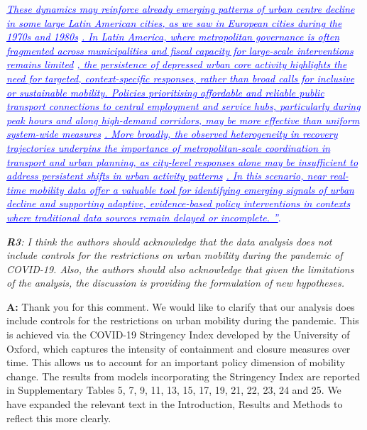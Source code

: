 \documentclass[12pt,a4paper,oneside, reqno]{amsart}
\begin{document}
{\begin{itemize}[noitemsep, topsep=0pt]
\end{itemize} }

\setlength{\leftskip}{1.3cm}\textcolor{blue}{\textit{\ul{These dynamics may reinforce already emerging patterns of urban centre decline in some large Latin American cities, as we saw in European cities during the 1970s and 1980s} \parencite{THORSTEN}\ul{. In Latin America, where metropolitan governance is often fragmented across municipalities and fiscal capacity for large-scale interventions remains limited} \parencite{un2022world, inostroza2013urban, fay2017rethinking, irazabal20governance}\ul{, the persistence of depressed urban core activity highlights the need for targeted, context-specific responses, rather than broad calls for inclusive or sustainable mobility. Policies prioritising affordable and reliable public transport connections to central employment and service hubs, particularly during peak hours and along high-demand corridors, may be more effective than uniform system-wide measures} \parencite{rivas2019urban, guzman2022effects}\ul{. More broadly, the observed heterogeneity in recovery trajectories underpins the importance of metropolitan-scale coordination in transport and urban planning, as city-level responses alone may be insufficient to address persistent shifts in urban activity patterns} \parencite{duque2021institutional}\ul{. In this scenario, near real-time mobility data offer a valuable tool for identifying emerging signals of urban decline and supporting adaptive, evidence-based policy interventions in contexts where traditional data sources remain delayed or incomplete. ''}}.}


\setlength{\leftskip}{1cm} \textit{\textbf{R3}: I think the authors should acknowledge that the data analysis does not include controls for the restrictions on urban mobility during the pandemic of COVID-19. Also, the authors should also acknowledge that given the limitations of the analysis, the discussion is providing the formulation of new hypotheses.}

\setlength{\leftskip}{1cm}\textbf{A:} Thank you for this comment. We would like to clarify that our analysis does include controls for the restrictions on urban mobility during the pandemic. This is achieved via the COVID-19 Stringency Index developed by the University of Oxford, which captures the intensity of containment and closure measures over time. This allows us to account for an important policy dimension of mobility change. The results from models incorporating the Stringency Index are reported in Supplementary Tables 5, 7, 9, 11, 13, 15, 17, 19, 21, 22, 23, 24 and 25. We have expanded the relevant text in the Introduction, Results and Methods to reflect this more clearly.
\end{document}
